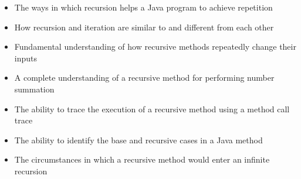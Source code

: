 \documentclass[11pt]{article}
\begin{document}
\begin{itemize}

  \itemsep 0in

  \item The ways in which recursion helps a Java program to achieve repetition
  \item How recursion and iteration are similar to and different from each other
  \item Fundamental understanding of how recursive methods repeatedly change their inputs
  \item A complete understanding of a recursive method for performing number summation
  \item The ability to trace the execution of a recursive method using a method call trace
  \item The ability to identify the base and recursive cases in a Java method
  \item The circumstances in which a recursive method would enter an infinite recursion

\end{itemize}
\end{document}
